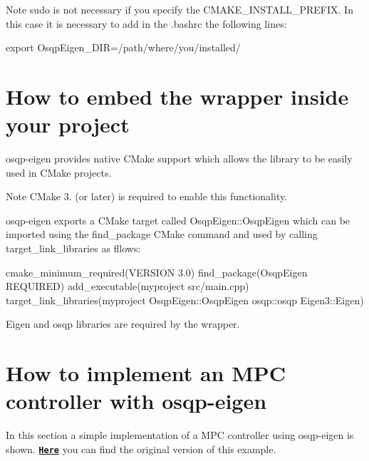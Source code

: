 \begin{DoxyNote}{Note}
{\ttfamily sudo} is not necessary if you specify the {\ttfamily C\+M\+A\+K\+E\+\_\+\+I\+N\+S\+T\+A\+L\+L\+\_\+\+P\+R\+E\+F\+IX}. In this case it is necessary to add in the {\ttfamily .bashrc} the following lines\+: 
\begin{DoxyCode}
export OsqpEigen\_DIR=/path/where/you/installed/
\end{DoxyCode}

\end{DoxyNote}
\hypertarget{index_use-section}{}\section{How to embed the wrapper inside your project}\label{index_use-section}
osqp-\/eigen provides native C\+Make support which allows the library to be easily used in C\+Make projects. \begin{DoxyNote}{Note}
C\+Make 3. (or later) is required to enable this functionality.
\end{DoxyNote}
osqp-\/eigen exports a C\+Make target called {\ttfamily Osqp\+Eigen\+::\+Osqp\+Eigen} which can be imported using the {\ttfamily find\+\_\+package} C\+Make command and used by calling {\ttfamily target\+\_\+link\+\_\+libraries} as fllows\+: 
\begin{DoxyCode}
cmake\_minimum\_required(VERSION 3.0)
find\_package(OsqpEigen REQUIRED)
add\_executable(myproject src/main.cpp)
target\_link\_libraries(myproject OsqpEigen::OsqpEigen osqp::osqp Eigen3::Eigen)
\end{DoxyCode}
 Eigen and osqp libraries are required by the wrapper.\hypertarget{index_example-section}{}\section{How to implement an M\+P\+C controller with osqp-\/eigen}\label{index_example-section}
In this section a simple implementation of a M\+PC controller using osqp-\/eigen is shown. \href{http://osqp.readthedocs.io/en/latest/examples/mpc.html}{\tt {\bfseries Here}} you can find the original version of this example.


